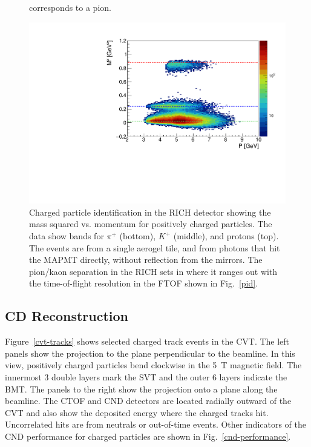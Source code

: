 \documentclass[final,3p]{elsarticle}
\begin{document}
\begin{twocolumn}
\begin{figure}[ht!]
{  corresponds to a pion.}
\label{rich-event}
\end{figure}
\begin{figure}[ht!]
\centerline{\includegraphics[width=1.0\columnwidth]{mass_min3.pdf}}
\caption{Charged particle identification in the RICH detector showing the mass squared vs. momentum for positively
  charged particles. The data show bands for $\pi^+$ (bottom), $K^+$ (middle), and protons (top). The events are
  from a single aerogel tile, and from photons that hit the MAPMT directly, without reflection from the mirrors. The
  pion/kaon separation in the RICH sets in where it ranges out with the time-of-flight resolution in the FTOF shown
  in Fig.~\ref{pid}.}
\label{rich_rec}
\end{figure}

\subsection{CD Reconstruction}

Figure~\ref{cvt-tracks} shows selected charged track events in the CVT. The left panels show the projection to
the plane perpendicular to the beamline. In this view, positively charged particles bend clockwise in the 5~T
magnetic field. The innermost 3 double layers mark the SVT and the outer 6 layers indicate the BMT. The panels to
the right show the projection onto a plane along the beamline. The CTOF and CND detectors are located radially
outward of the CVT and also show the deposited energy where the charged tracks hit. Uncorrelated hits are from
neutrals or out-of-time events. Other indicators of the CND performance for charged particles are shown in
Fig.~\ref{cnd-performance}.  


\end{twocolumn}
\end{document}
